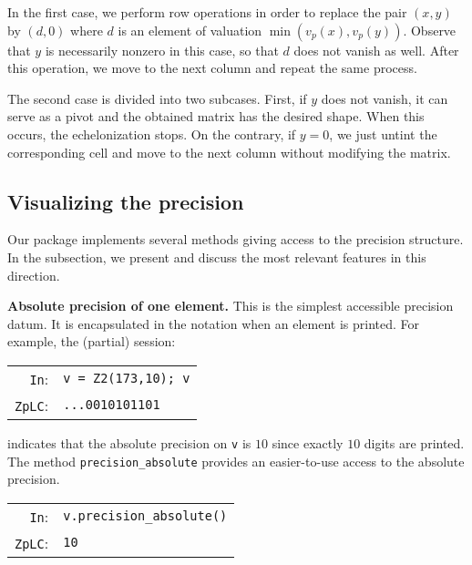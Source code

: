 \documentclass[sigconf]{acmart}
\newcommand{\ttv}{\texttt{v}\xspace}
\newcommand{\cIn}{{\color{input} \tt \phantom{Zp}In}:}
\newcommand{\cZpLC}{{\color{output} \tt ZpLC}:}
\theoremstyle{definition}
\begin{document}
\noindent

In the first case, we perform row operations in order to replace the 
pair $(x,y)$ by $(d, 0)$ where $d$ is an element of valuation 
$\min(v_p(x), v_p(y))$. Observe that $y$ is necessarily nonzero in this case, 
so that $d$ does not vanish as well. After this operation, we move to
the next column and repeat the same process.

The second case is divided into two subcases. First, if $y$ does not 
vanish, it can serve as a pivot and the obtained matrix has the desired 
shape. When this occurs, the echelonization stops. On the contrary, if 
$y = 0$, we just untint the corresponding cell and move to the next 
column without modifying the matrix.

\subsection{Visualizing the precision}
\label{ssec:viewprec}

Our package implements several methods giving access to the precision 
structure. In the subsection, we present and discuss the most relevant 
features in this direction.

\medskip

\noindent \textbf{Absolute precision of one element.}
%
This is the simplest accessible precision datum.
It is encapsulated in the notation when an element is printed. For
example, the (partial) session:

\smallskip

{\noindent \small
\noindent
\begin{tabular}{rl}
\cIn   & \verb?v = ?{\color{ring}\verb?Z2?}\verb?(173,10); v? \\
\cZpLC & \verb?...0010101101?
\end{tabular}}

\smallskip

\noindent
indicates that the absolute precision on \ttv is $10$ since
exactly $10$ digits are printed.
The method {\color{method}\verb?precision_absolute?} provides an 
easier-to-use access to the absolute precision.

\smallskip

{\noindent \small
\noindent
\begin{tabular}{rl}
\cIn   & \verb?v.?{\color{method}\verb?precision_absolute?}\verb?()? \\
\cZpLC & \verb?10?
\end{tabular}}

\smallskip
\end{document}
